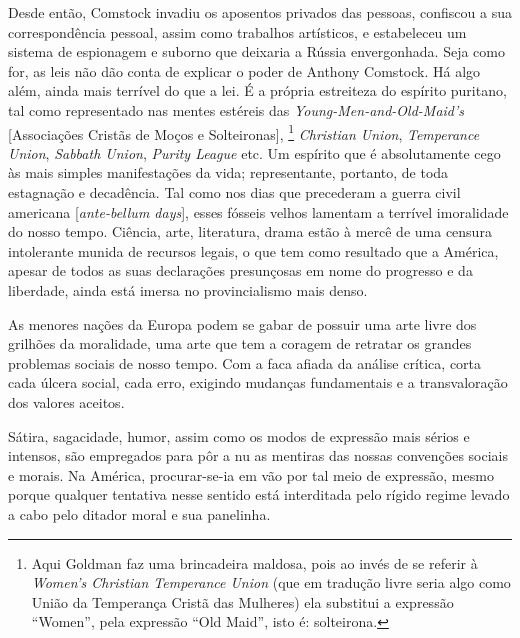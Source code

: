 Desde então, Comstock invadiu os aposentos privados das pessoas,
confiscou a sua correspondência pessoal, assim como trabalhos
artísticos, e estabeleceu um sistema de espionagem e suborno que
deixaria a Rússia envergonhada. Seja como for, as leis não dão conta de
explicar o poder de Anthony Comstock. Há algo além, ainda mais terrível
do que a lei. É a própria estreiteza do espírito puritano, tal como
representado nas mentes estéreis das \emph{Young-Men-and-Old-Maid's}
{[}Associações Cristãs de Moços e Solteironas{]}, \footnote{Aqui Goldman
  faz uma brincadeira maldosa, pois ao invés de se referir à
  \emph{Women's Christian Temperance Union} (que em tradução livre seria
  algo como União da Temperança Cristã das Mulheres) ela substitui a
  expressão ``Women'', pela expressão ``Old Maid'', isto é: solteirona.}
\emph{Christian Union}, \emph{Temperance Union}, \emph{Sabbath Union},
\emph{Purity League} etc. Um espírito que é absolutamente cego às mais
simples manifestações da vida; representante, portanto, de toda
estagnação e decadência. Tal como nos dias que precederam a guerra civil
americana {[}\emph{ante-bellum days}{]}, esses fósseis velhos lamentam a
terrível imoralidade do nosso tempo. Ciência, arte, literatura, drama
estão à mercê de uma censura intolerante munida de recursos legais, o
que tem como resultado que a América, apesar de todos as suas
declarações presunçosas em nome do progresso e da liberdade, ainda está
imersa no provincialismo mais denso.

As menores nações da Europa podem se gabar de possuir uma arte livre dos
grilhões da moralidade, uma arte que tem a coragem de retratar os
grandes problemas sociais de nosso tempo. Com a faca afiada da análise
crítica, corta cada úlcera social, cada erro, exigindo mudanças
fundamentais e a transvaloração dos valores aceitos.

Sátira, sagacidade, humor, assim como os modos de expressão mais sérios
e intensos, são empregados para pôr a nu as mentiras das nossas
convenções sociais e morais. Na América, procurar-se-ia em vão por tal
meio de expressão, mesmo porque qualquer tentativa nesse sentido está
interditada pelo rígido regime levado a cabo pelo ditador moral e sua
panelinha.

